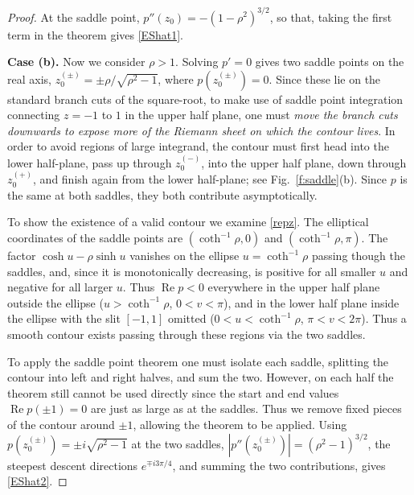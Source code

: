 \documentclass[10pt]{article}
\DeclareMathOperator{\re}{Re}
\begin{document}
\begin{proof}
At the saddle point, $p''(z_0) = -(1-\rho^2)^{3/2}$,
so that, taking the first term in the theorem
\cite[Thm.~7.1, p.~127]{olver}
gives \eqref{EShat1}.

{\bf Case (b).}
Now we consider $\rho>1$.
Solving $p'=0$ gives two saddle points on the real axis,
$z_0^{(\pm)} = \pm \rho/\sqrt{\rho^2-1}$, where $p(z_0^{(\pm)}) = 0$.
Since these lie on the standard branch cuts of the square-root,
to make use of saddle point integration connecting
$z=-1$ to $1$ in the upper half plane,
one must {\em move the branch cuts downwards to expose more of the Riemann
sheet on which the contour lives}.
In order to avoid regions of large integrand, the contour must
first head into the lower half-plane, pass up through $z_0^{(-)}$,
into the upper half plane, down through $z_0^{(+)}$,
and finish again from the lower half-plane; see Fig.~\ref{f:saddle}(b).
Since $p$ is the same at both saddles, they both contribute asymptotically.

To show the existence of a valid contour we examine \eqref{repz}.
The elliptical coordinates of the saddle points are $(\coth^{-1}\rho,0)$
and $(\coth^{-1}\rho,\pi)$.
The factor $\cosh u - \rho \sinh u$ vanishes on the ellipse
$u=\coth^{-1}\rho$ passing though the saddles, and,
since it is monotonically decreasing,
is positive for all smaller $u$ and negative for all larger $u$.
Thus $\re p<0$ everywhere in the upper half plane outside the ellipse
($u>\coth^{-1}\rho$, $0<v<\pi$), and in the lower half plane
inside the ellipse with the slit $[-1,1]$ omitted
($0<u<\coth^{-1}\rho$, $\pi<v<2\pi$).
Thus a smooth contour exists passing through these regions via the two saddles.

To apply the saddle point theorem one must isolate each saddle,
splitting the contour into left and right halves, and sum the two.
However, on each half the theorem still cannot be used directly since
the start and end values $\re p(\pm1)=0$ are just as large
as at the saddles.
Thus we remove fixed pieces of the contour around $\pm1$,
allowing the theorem to be applied.
Using $p(z_0^{(\pm)}) = \pm i \sqrt{\rho^2-1}$ at the two saddles,
$|p''(z_0^{(\pm)})| = (\rho^2-1)^{3/2}$,
the steepest descent directions $e^{\mp i 3\pi/4}$,
and summing the two contributions, gives \eqref{EShat2}.


\end{proof}
\end{document}

